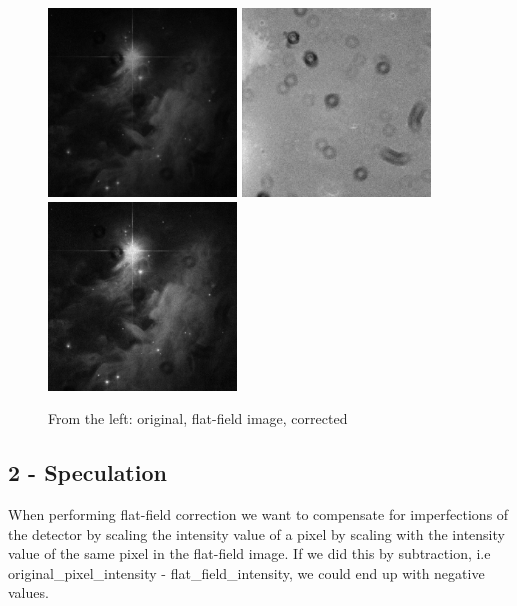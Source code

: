 \begin{figure}[h!]
    \centering
    \includegraphics[width=5cm]{../LAB1/img/disturbed_potw1144a.png}
    \includegraphics[width=5cm]{../LAB1/img/flatfieldimage.png}
    \includegraphics[width=5cm]{../LAB1/output/disturbed_potw1144a.png}
    \caption{From the left: original, flat-field image, corrected}
\end{figure}

\subsection*{2 - Speculation}

When performing flat-field correction we want to compensate for imperfections of the detector by scaling the intensity value of a pixel by scaling with the intensity value of the same pixel in the flat-field image.
If we did this by subtraction, i.e original\_pixel\_intensity - flat\_field\_intensity, we could end up with negative values.



